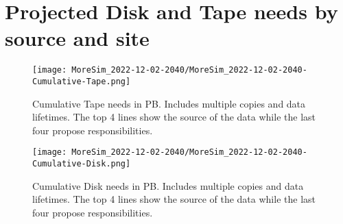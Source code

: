 \section{Projected Disk and Tape needs by source and site}
\begin{figure}[h]
\centering\texttt{[image: MoreSim\_2022-12-02-2040/MoreSim\_2022-12-02-2040-Cumulative-Tape.png]}
\caption{Cumulative Tape needs in PB. Includes multiple copies and data lifetimes. The top 4 lines show the source of the data while the last four propose responsibilities.}
\label{fig:Cumulative-Tape}
\end{figure}
\begin{figure}[h]
\centering\texttt{[image: MoreSim\_2022-12-02-2040/MoreSim\_2022-12-02-2040-Cumulative-Disk.png]}
\caption{Cumulative Disk needs in PB. Includes multiple copies and data lifetimes. The top 4 lines show the source of the data while the last four propose responsibilities.}
\label{fig:Cumulative-Disk}
\end{figure}
